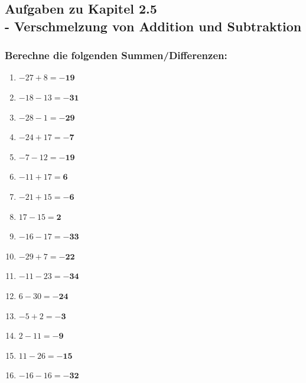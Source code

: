 \documentclass[a4paper,10pt]{article} %
\begin{document}
\subsection{Aufgaben zu Kapitel 2.5 \\
  - Verschmelzung von Addition und Subtraktion}

\subsubsection{Berechne die folgenden Summen/Differenzen:} %

\begin{enumerate}

  \item \(-27 + 8 =
    \mathbf{-19}\) %

  \item \(-18 - 13 =
    \mathbf{-31}\) %

  \item \(-28 - 1 =
    \mathbf{-29}\) %

  \item \(-24 + 17 =
    \mathbf{-7}\) %

  \item \(-7 - 12 =
    \mathbf{-19}\) %

  \item \(-11 + 17 =
    \mathbf{6}\) %

  \item \(-21 + 15 =
    \mathbf{-6}\) %

  \item \(17 - 15 =
    \mathbf{2}\) %

  \item \(-16 - 17 =
    \mathbf{-33}\) %

  \item \(-29 + 7 =
    \mathbf{-22}\) %

  \item \(-11 - 23 =
    \mathbf{-34}\) %

  \item \(6 - 30 =
    \mathbf{-24}\) %

  \item \(-5 + 2 =
    \mathbf{-3}\) %

  \item \(2 - 11 =
    \mathbf{-9}\) %

  \item \(11 - 26 =
    \mathbf{-15}\) %

  \item \(-16 - 16 =
    \mathbf{-32}\) %


\end{enumerate}
\end{document}
